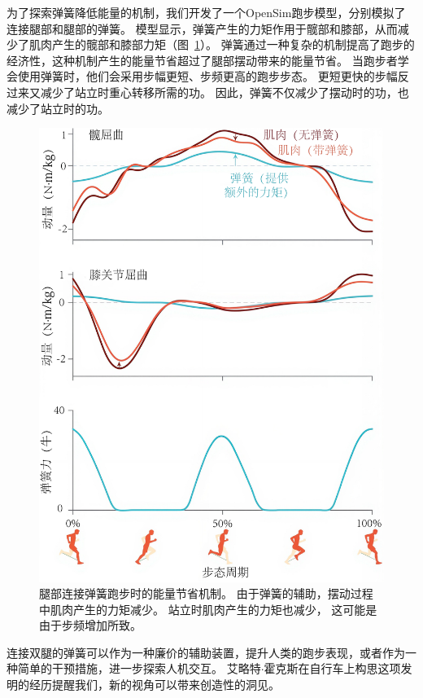 为了探索弹簧降低能量的机制，我们开发了一个OpenSim跑步模型，分别模拟了连接腿部和腿部的弹簧。
模型显示，弹簧产生的力矩作用于髋部和膝部，从而减少了肌肉产生的髋部和膝部力矩（图~\ref{fig:12_16}）。
弹簧通过一种复杂的机制提高了跑步的经济性，这种机制产生的能量节省超过了腿部摆动带来的能量节省。
当跑步者学会使用弹簧时，他们会采用步幅更短、步频更高的跑步步态。
更短更快的步幅反过来又减少了站立时重心转移所需的功。
因此，弹簧不仅减少了摆动时的功，也减少了站立时的功。


\begin{figure}[!htb]
	\centering
	\includegraphics[width=0.75\linewidth]{chap12/12_16}
	\caption{腿部连接弹簧跑步时的能量节省机制。
		由于弹簧的辅助，摆动过程中肌肉产生的力矩减少。
		站立时肌肉产生的力矩也减少，
		这可能是由于步频增加所致\cite{simpson2019connecting}。 \label{fig:12_16}}
\end{figure}


连接双腿的弹簧可以作为一种廉价的辅助装置，提升人类的跑步表现，或者作为一种简单的干预措施，进一步探索人机交互。
艾略特$\cdot$霍克斯在自行车上构思这项发明的经历提醒我们，新的视角可以带来创造性的洞见。
